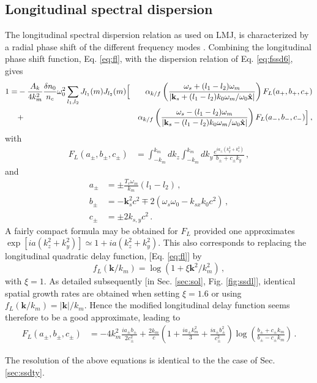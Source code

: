 \documentclass[
 reprint,
 amsmath,amssymb,
 aps,
]{revtex4-1}
\begin{document}
\begin{widetext}
\subsection{Longitudinal  spectral dispersion}\label{sec:ssdl}
The longitudinal spectral dispersion relation as used on LMJ, is characterized by a radial phase shift of the different frequency modes \cite[]{POP_Duluc_2019}. Combining the longitudinal phase shift function,  Eq. \eqref{eq:fl}, with the dispersion relation of Eq. \eqref{eq:fssd6}, gives \begin{align}
   1 =& - \frac{A_k}{4k_m^2}  \frac{\delta n_0}{n_c}\omega_0^2
    \sum_{l_1, l_2} 
     J_{l_1}(m)J_{l_2}(m) 
      \Big[&
       \alpha_{k/f}\left(\frac{\omega_s+(l_1-l_2)\omega_m}
  {\vert\mathbf{k}_s+(l_1-l_2)k_0\omega_m/\omega_0\Hat{\mathbf{x}} \vert}
  \right) 
       F_L(a_+,b_+,c_+)
     \nonumber \\&
      + &\alpha_{k/f}\left(\frac{\omega_s-(l_1-l_2)\omega_m}
  {\vert\mathbf{k}_s-(l_1-l_2)k_0\omega_m/\omega_0\Hat{\mathbf{x}} \vert}
  \right) 
     F_L(a_-,b_-,c_-)
    \Big]
   \, ,\label{eq:fssdl}
   \end{align}
with 
\begin{align}
    F_L(a_\pm,b_\pm,c_\pm)&= \int_{-k_m}^{k_m}dk_z\int_{-k_m}^{k_m} dk_y \frac{e^{ia_\pm(k_y^2 + k_z^2)}}{b_\pm+c_\pm k_y }\, ,
\end{align}
and
\begin{align}
    a_\pm&=\pm\frac{T_r\omega_m}{k_m}(l_1-l_2)\, ,\label{eq:fla}\\
    b_\pm&=- \mathbf{k}_s^2c^2 \mp 2(\omega_s\omega_{0}-k_{sx}k_0c^2) \, ,\label{eq:flb} \\
    c_\pm&=\pm 2 k_{s,y}c^2\, .\label{eq:flc}
\end{align}
A fairly compact formula may be obtained for $F_L$ provided one approximates $\exp[ia(k_z^2+k_y^2)]\simeq 1+ia(k_z^2+k_y^2)$. This also corresponds to replacing the longitudinal quadratic delay function, [Eq. \eqref{eq:fl}] by 
\begin{equation}\label{eq:fl_ap}
f_L(\mathbf{k}/k_m) = \log(1+\xi \mathbf{k}^2/k_m^2)\, ,
\end{equation}
with $\xi=1$. As detailed subsequently [in Sec. \ref{sec:sol}, Fig. \ref{fig:ssdl}], identical spatial growth rates are obtained when setting $\xi=1.6$ or using   $f_L(\mathbf{k}/k_m) = \vert \mathbf{k}\vert /k_m$.  Hence the modified longitudinal delay function   seems therefore to be a good approximate, leading to 
\begin{align}
    F_L(a_\pm,b_\pm,c_\pm)&=-4k_m^2 \frac{ia_\pm b_\pm}{2c_\pm^2} +\frac{2k_m}{c}\left(1+\frac{ia_\pm k_m^2}{3}+\frac{ia_\pm b_\pm^2}{c_\pm^2}\right) \log\left( \frac{b_\pm+c_\pm k_m}{b_\pm-c_\pm k_m}   \right) \, .
\end{align}
\end{widetext}
The resolution of the above equations is identical to the the case of Sec. \ref{sec:ssdty}.
\end{document}
